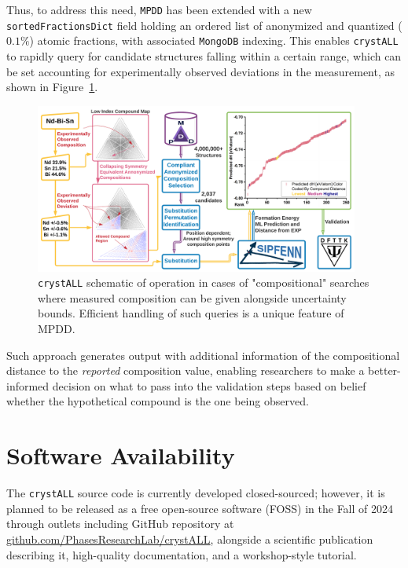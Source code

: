 Thus, to address this need, \texttt{MPDD} has been extended with a new \texttt{sortedFractionsDict} field holding an ordered list of anonymized and quantized ($0.1\%$) atomic fractions, with associated \texttt{MongoDB} indexing. This enables \texttt{crystALL} to rapidly query for candidate structures falling within a certain range, which can be set accounting for experimentally observed deviations in the measurement, as shown in Figure~\ref{fig:crystallcomposition}.

\begin{figure}[h]
    \centering
    \includegraphics[width=0.95\textwidth]{crystall/crystALL_composition_diagram_V3.png}
    \caption{\texttt{crystALL} schematic of operation in cases of "compositional" searches where measured composition can be given alongside uncertainty bounds. Efficient handling of such queries is a unique feature of MPDD.}
    \label{fig:crystallcomposition}
\end{figure}

Such approach generates output with additional information of the compositional distance to the \textit{reported} composition value, enabling researchers to make a better-informed decision on what to pass into the validation steps based on belief whether the hypothetical compound is the one being observed.

\section{Software Availability} \label{crystall:sec:softwareavaialbility}

The \texttt{crystALL} source code is currently developed closed-sourced; however, it is planned to be released as a free open-source software (FOSS) in the Fall of 2024 through outlets including GitHub repository at \href{https://github.com/PhasesResearchLab/crystALL}{github.com/PhasesResearchLab/crystALL}, alongside a scientific publication describing it, high-quality documentation, and a workshop-style tutorial.

% 


\printbibliography[heading=subbibintoc]